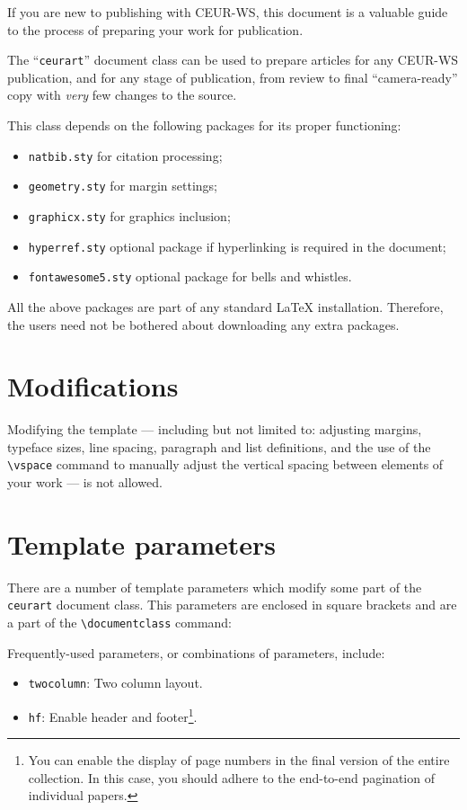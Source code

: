 \documentclass[
]{ceurart}
\begin{document}
If you are new to publishing with CEUR-WS, this document is a valuable
guide to the process of preparing your work for publication.

The ``\verb|ceurart|'' document class can be used to prepare articles
for any CEUR-WS publication, and for any stage of publication, from
review to final ``camera-ready'' copy with {\itshape very} few changes
to the source.

This class depends on the following packages
for its proper functioning:

\begin{itemize}
\item \verb|natbib.sty| for citation processing;
\item \verb|geometry.sty| for margin settings;
\item \verb|graphicx.sty| for graphics inclusion;
\item \verb|hyperref.sty| optional package if hyperlinking is required in
  the document;
\item \verb|fontawesome5.sty| optional package for bells and whistles.
\end{itemize}

All the above packages are part of any
standard \LaTeX{} installation.
Therefore, the users need not be
bothered about downloading any extra packages.

\section{Modifications}

Modifying the template --- including but not limited to: adjusting
margins, typeface sizes, line spacing, paragraph and list definitions,
and the use of the \verb|\vspace| command to manually adjust the
vertical spacing between elements of your work --- is not allowed.

\section{Template parameters}

There are a number of template
parameters which modify some part of the \verb|ceurart| document class.
This parameters are enclosed in square
brackets and are a part of the \verb|\documentclass| command:

Frequently-used parameters, or combinations of parameters, include:
\begin{itemize}
\item {\verb|twocolumn|}: Two column layout.
\item {\verb|hf|}: Enable header and footer\footnote{You can enable
    the display of page numbers in the final version of the entire
    collection. In this case, you should adhere to the end-to-end
    pagination of individual papers.}.
\end{itemize}
\end{document}
